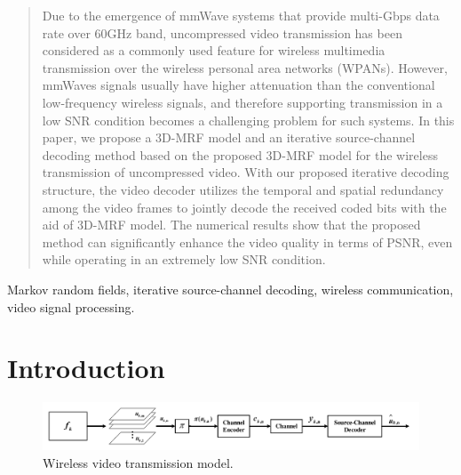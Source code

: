 \documentclass[10pt,twocolumn,twoside]{IEEEtran}
\begin{document}
\begin{abstract}
Due to the emergence of mmWave systems that provide multi-Gbps data rate over 60GHz band, uncompressed video transmission has been considered as a commonly used feature for wireless multimedia transmission over the wireless personal area networks (WPANs). However, mmWaves signals usually have higher attenuation than the conventional low-frequency wireless signals, and therefore supporting transmission in a low SNR condition becomes a challenging problem for such systems. In this paper, we propose a 3D-MRF model and an iterative source-channel decoding method based on the proposed 3D-MRF model for the wireless transmission of uncompressed video. With our proposed iterative decoding structure, the video decoder utilizes the temporal and spatial redundancy among the video frames to jointly decode the received coded bits with the aid of 3D-MRF model. The numerical results show that the proposed method can significantly enhance the video quality in terms of PSNR, even while operating in an extremely low SNR condition. 
\end{abstract}

\begin{IEEEkeywords}
Markov random fields, iterative source-channel decoding, wireless communication, video signal processing.
\end{IEEEkeywords}



%
\IEEEpeerreviewmaketitle



\section{Introduction}

\begin{figure}[!t]
	\centering
	\includegraphics[width=\textwidth]{sm.pdf}
	\caption{Wireless video transmission model.}
\label{trans_model}
\end{figure}
\end{document}
